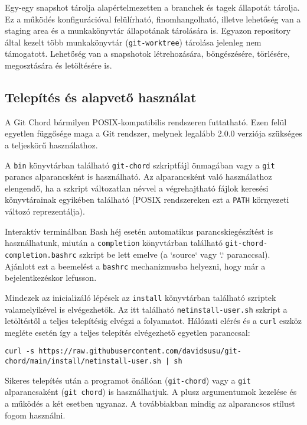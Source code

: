 \documentclass[
]{elteikthesis}[2025/03/25]
\begin{document}
Egy-egy snapshot tárolja alapértelmezetten a branchek és tagek állapotát tárolja.
Ez a működés konfigurációval felülírható, finomhangolható,
illetve lehetőség van a staging area és a munkakönyvtár állapotának tárolására is.
Egyazon repository által kezelt több munkakönyvtár (\texttt{git-worktree}) tárolása jelenleg nem támogatott.
Lehetőség van a snapshotok létrehozására, böngészésére, törlésére, megosztására és letöltésére is.

\subsection{Telepítés és alapvető használat}

A Git Chord bármilyen POSIX-kompatibilis rendszeren futtatható.
Ezen felül egyetlen függősége maga a Git rendszer,
melynek legalább 2.0.0 verziója szükséges a teljeskörű használathoz.

A \texttt{bin} könyvtárban található \texttt{git-chord} szkriptfájl önmagában vagy a \texttt{git} parancs alparancsként is használható.
Az alparancsként való használathoz elengendő, ha a szkript változatlan névvel a végrehajtható fájlok keresési könyvtárainak egyikében található (POSIX rendszereken ezt a \texttt{PATH} környezeti változó reprezentálja).

Interaktív terminálban Bash héj esetén automatikus parancskiegészítést is használhatunk,
miután a \texttt{completion} könyvtárban található \texttt{git-chord-completion.bashrc} szkript be lett emelve (a `source` vagy `.` paranccsal).
Ajánlott ezt a beemelést a \texttt{bashrc} mechanizmusba helyezni,
hogy már a bejelentkezéskor lefusson.

Mindezek az inicializáló lépések az \texttt{install} könyvtárban található szriptek valamelyikével is elvégezhetők.
Az itt található \texttt{netinstall-user.sh} szkript a letöltéstől a teljes telepítésig elvégzi a folyamatot.
Hálózati elérés és a \texttt{curl} eszköz megléte esetén így a teljes telepítés elvégezhető egyetlen paranccsal:

\begin{verbatim}
curl -s https://raw.githubusercontent.com/davidsusu/git-chord/main/install/netinstall-user.sh | sh
\end{verbatim}

Sikeres telepítés után a programot önállóan (\texttt{git-chord})
vagy a \texttt{git} alparancsaként (\texttt{git chord}) is használhatjuk.
A plusz argumentumok kezelése és a működés a két esetben ugyanaz.
A továbbiakban mindig az alparancsos stílust fogom használni.
\end{document}
